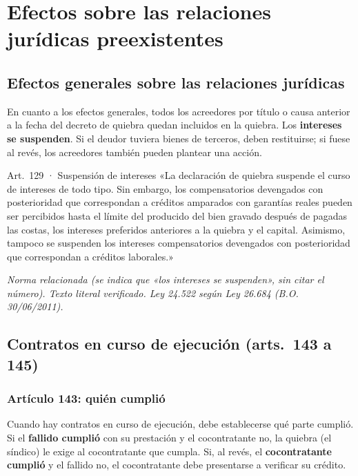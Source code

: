 \documentclass[12pt,oneside]{book}
\begin{document}
\chapter[Relaciones jurídicas preexistentes]{Efectos sobre las relaciones jurídicas preexistentes}

\section{Efectos generales sobre las relaciones jurídicas}

En cuanto a los efectos generales, todos los acreedores por título o causa anterior a la fecha del decreto de quiebra quedan incluidos en la quiebra. Los \textbf{intereses se suspenden}. Si el deudor tuviera bienes de terceros, deben restituirse; si fuese al revés, los acreedores también pueden plantear una acción.

\begin{norma}{Art.~129 · Suspensión de intereses}
«La declaración de quiebra suspende el curso de intereses de todo tipo. Sin embargo, los compensatorios devengados con posterioridad que correspondan a créditos amparados con garantías reales pueden ser percibidos hasta el límite del producido del bien gravado después de pagadas las costas, los intereses preferidos anteriores a la quiebra y el capital. Asimismo, tampoco se suspenden los intereses compensatorios devengados con posterioridad que correspondan a créditos laborales.»

\par\smallskip\textit{Norma relacionada (se indica que «los intereses se suspenden», sin citar el número). Texto literal verificado. Ley 24.522 según Ley 26.684 (B.O. 30/06/2011).}
\end{norma}

\section{Contratos en curso de ejecución (arts.~143 a 145)}

\subsection{Artículo 143: quién cumplió}

Cuando hay contratos en curso de ejecución, debe establecerse qué parte cumplió. Si el \textbf{fallido cumplió} con su prestación y el cocontratante no, la quiebra (el síndico) le exige al cocontratante que cumpla. Si, al revés, el \textbf{cocontratante cumplió} y el fallido no, el cocontratante debe presentarse a verificar su crédito.
\end{document}
